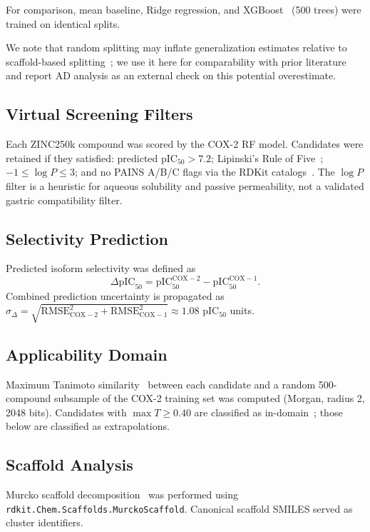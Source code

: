 \documentclass[11pt]{article}
\begin{document}
For comparison, mean baseline, Ridge regression, and XGBoost~\cite{chen2016} (500 trees) were trained on identical splits.

We note that random splitting may inflate generalization estimates relative to scaffold-based splitting~\cite{martin2017}; we use it here for comparability with prior literature and report AD analysis as an external check on this potential overestimate.

\subsection{Virtual Screening Filters}

Each ZINC250k compound was scored by the COX-2 RF model. Candidates were retained if they satisfied: predicted pIC$_{50}>7.2$; Lipinski's Rule of Five~\cite{lipinski1997}; $-1\leq\log P\leq 3$; and no PAINS A/B/C flags via the RDKit catalogs~\cite{baell2010}. The $\log P$ filter is a heuristic for aqueous solubility and passive permeability, not a validated gastric compatibility filter.

\subsection{Selectivity Prediction}

Predicted isoform selectivity was defined as
\[
\Delta\mathrm{pIC}_{50} = \mathrm{pIC}_{50}^{\mathrm{COX-2}} - \mathrm{pIC}_{50}^{\mathrm{COX-1}}.
\]
Combined prediction uncertainty is propagated as
$\sigma_{\Delta} = \sqrt{\mathrm{RMSE}_{\mathrm{COX-2}}^2 + \mathrm{RMSE}_{\mathrm{COX-1}}^2} \approx 1.08$ pIC$_{50}$ units.

\subsection{Applicability Domain}

Maximum Tanimoto similarity~\cite{landrum2006} between each candidate and a random 500-compound subsample of the COX-2 training set was computed (Morgan, radius 2, 2048 bits). Candidates with $\max T \geq 0.40$ are classified as in-domain~\cite{sheridan2004}; those below are classified as extrapolations.

\subsection{Scaffold Analysis}

Murcko scaffold decomposition~\cite{bemis1996} was performed using \texttt{rdkit.Chem.\allowbreak Scaffolds.\allowbreak MurckoScaffold}. Canonical scaffold SMILES served as cluster identifiers.
\end{document}
